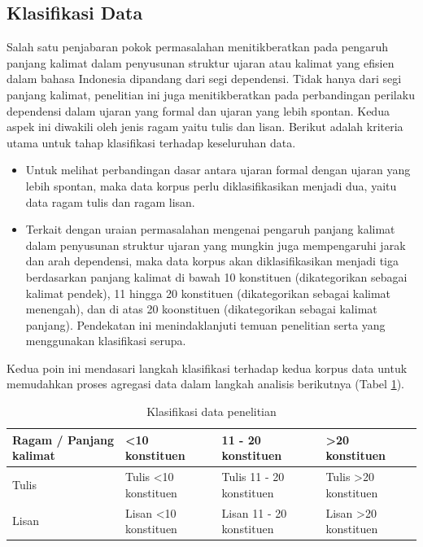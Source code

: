 \subsection{Klasifikasi Data}
Salah satu penjabaran pokok permasalahan menitikberatkan pada pengaruh panjang kalimat dalam penyusunan struktur ujaran atau kalimat yang efisien dalam bahasa Indonesia dipandang dari segi dependensi. Tidak hanya dari segi panjang kalimat, penelitian ini juga menitikberatkan pada perbandingan perilaku dependensi dalam ujaran yang formal dan ujaran yang lebih spontan. Kedua aspek ini diwakili oleh jenis ragam yaitu tulis dan lisan. Berikut adalah kriteria utama untuk tahap klasifikasi terhadap keseluruhan data.

\begin{itemize}
	\item Untuk melihat perbandingan dasar antara ujaran formal dengan ujaran yang lebih spontan, maka data korpus perlu diklasifikasikan menjadi dua, yaitu data ragam tulis dan ragam lisan.
	\item Terkait dengan uraian permasalahan mengenai pengaruh panjang kalimat dalam penyusunan struktur ujaran yang mungkin juga mempengaruhi jarak dan arah dependensi, maka data korpus akan diklasifikasikan menjadi tiga berdasarkan panjang kalimat di bawah 10 konstituen (dikategorikan sebagai kalimat pendek), 11 hingga 20 konstituen (dikategorikan sebagai kalimat menengah), dan di atas 20 koonstituen (dikategorikan sebagai kalimat panjang). Pendekatan ini menindaklanjuti temuan penelitian \cite{oya2011syntactic} serta \cite{jiang2015effects} yang menggunakan klasifikasi serupa. 
\end{itemize}

Kedua poin ini mendasari langkah klasifikasi terhadap kedua korpus data untuk memudahkan proses agregasi data dalam langkah analisis berikutnya (Tabel \ref{tab:tabel_klasifikasi_data}). 

\begin{table}
\begin{center}
  \caption{Klasifikasi data penelitian}\label{tab:tabel_klasifikasi_data}
  \begin{tabular}{ | l | l | l | l |}
    \hline
    Ragam / Panjang kalimat & \textless 10 konstituen & 11 - 20 konstituen & \textgreater 20 konstituen \\ \hline
    Tulis & Tulis \textless 10 konstituen & Tulis 11 - 20 konstituen & Tulis \textgreater 20 konstituen  \\ \hline
    Lisan & Lisan \textless 10 konstituen & Lisan 11 - 20 konstituen & Lisan \textgreater 20 konstituen \\
    \hline
  \end{tabular}
\end{center}
\end{table}

